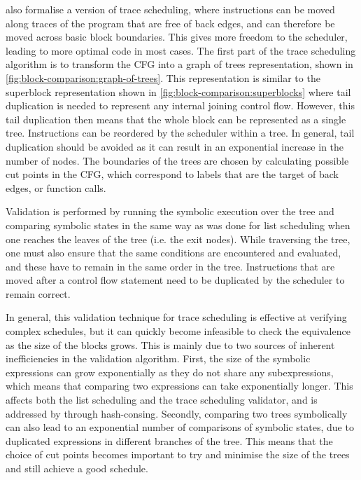 \textcite{tristan08_formal_verif_trans_valid} also formalise a version of trace
scheduling, where instructions can be moved along traces of the program that are
free of back edges, and can therefore be moved across basic block boundaries.
This gives more freedom to the scheduler, leading to more optimal code in most
cases.  The first part of the trace scheduling algorithm is to transform the
\gls{CFG} into a graph of trees representation, shown in
\cref{fig:block-comparison:graph-of-trees}.  This representation is similar to
the superblock representation shown in \cref{fig:block-comparison:superblocks}
where tail duplication is needed to represent any internal joining control flow.
However, this tail duplication then means that the whole block can be
represented as a single tree.  Instructions can be reordered by the scheduler
within a tree.  In general, tail duplication should be avoided as it can result
in an exponential increase in the number of nodes.  The boundaries of the trees
are chosen by calculating possible cut points in the \gls{CFG}, which correspond
to labels that are the target of back edges, or function calls.

Validation is performed by running the symbolic execution over the tree and
comparing symbolic states in the same way as was done for list scheduling when
one reaches the leaves of the tree (i.e. the exit nodes).  While traversing the
tree, one must also ensure that the same conditions are encountered and
evaluated, and these have to remain in the same order in the tree.  Instructions
that are moved after a control flow statement need to be duplicated by the
scheduler to remain correct.

In general, this validation technique for trace scheduling is effective at
verifying complex schedules, but it can quickly become infeasible to check the
equivalence as the size of the blocks grows.  This is mainly due to two sources
of inherent inefficiencies in the validation algorithm.  First, the size of the
symbolic expressions can grow exponentially as they do not share any
subexpressions, which means that comparing two expressions can take
exponentially longer.  This affects both the list scheduling and the trace
scheduling validator, and is addressed by
\citeauthor{six20_certif_effic_instr_sched} through hash-consing.  Secondly,
comparing two trees symbolically can also lead to an exponential number of
comparisons of symbolic states, due to duplicated expressions in different branches of the
tree.  This means that the choice of cut points becomes
important to try and minimise the size of the trees and still achieve a good
schedule.

